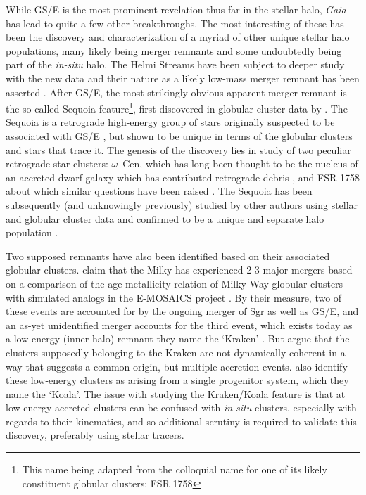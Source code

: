 While GS/E is the most prominent revelation thus far in the stellar halo, \textit{Gaia} has lead to quite a few other breakthroughs. The most interesting of these has been the discovery and characterization of a myriad of other unique stellar halo populations, many likely being merger remnants and some undoubtedly being part of the \textit{in-situ} halo. The Helmi Streams \parencite{helmi99} have been subject to deeper study with the new data and their nature as a likely low-mass merger remnant has been asserted \parencite{koppelman19a}. After GS/E, the most strikingly obvious apparent merger remnant is the so-called Sequoia feature\footnote{This name being adapted from the colloquial name for one of its likely constituent globular clusters: FSR 1758}, first discovered in globular cluster data by \textcite{myeong19}. The Sequoia is a retrograde high-energy group of stars originally suspected to be associated with GS/E \parencite{helmi18}, but shown to be unique in terms of the globular clusters and stars that trace it. The genesis of the discovery lies in  study of two peculiar retrograde star clusters: $\omega$~Cen, which has long been thought to be the nucleus of an accreted dwarf galaxy which has contributed retrograde debris \parencite{bekki03,majewski12}, and FSR 1758 about which similar questions have been raised \parencite{froebrich07,barba19}. The Sequoia has been subsequently (and unknowingly previously) studied by other authors using stellar and globular cluster data and confirmed to be a unique and separate halo population \parencite{koppelman19b,kruijssen20,monty20,naidu20}.

Two supposed remnants have also been identified based on their associated globular clusters. \textcite{kruijssen19b} claim that the Milky has experienced 2-3 major mergers based on a comparison of the age-metallicity relation of Milky Way globular clusters with simulated analogs in the E-MOSAICS project \parencite{kruijssen19a}. By their measure, two of these events are accounted for by the ongoing merger of Sgr as well as GS/E, and an as-yet unidentified merger accounts for the third event, which exists today as a low-energy (inner halo) remnant they name the `Kraken' \parencite{kruijssen20}. But \textcite{massari19} argue that the clusters supposedly belonging to the Kraken are not dynamically coherent in a way that suggests a common origin, but multiple accretion events. \textcite{forbes20} also identify these low-energy clusters as arising from a single progenitor system, which they name the `Koala'. The issue with studying the Kraken/Koala feature is that at low energy accreted clusters can be confused with \textit{in-situ} clusters, especially with regards to their kinematics, and so additional scrutiny is required to validate this discovery, preferably using stellar tracers.

